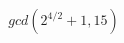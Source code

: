 \documentclass[preview]{standalone}
\begin{document}
\begin{align*}
gcd(2^{4/2} + 1, 15)
\end{align*}
\end{document}
